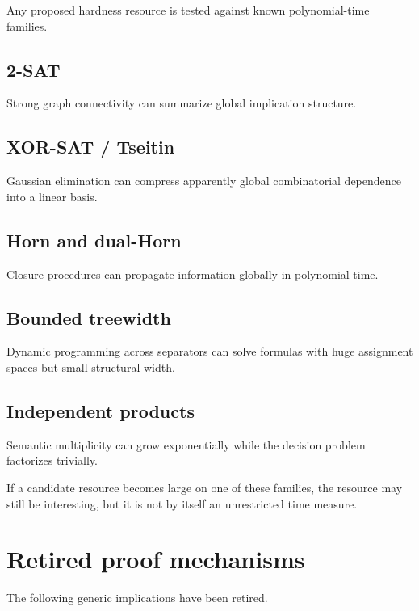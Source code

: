 \documentclass[11pt]{article}
\theoremstyle{plain}
\theoremstyle{definition}
\theoremstyle{remark}
\begin{document}
Any proposed hardness resource is tested against known polynomial-time
families.

\subsection{2-SAT}

Strong graph connectivity can summarize global implication structure.

\subsection{XOR-SAT / Tseitin}

Gaussian elimination can compress apparently global combinatorial dependence
into a linear basis.

\subsection{Horn and dual-Horn}

Closure procedures can propagate information globally in polynomial time.

\subsection{Bounded treewidth}

Dynamic programming across separators can solve formulas with huge assignment
spaces but small structural width.

\subsection{Independent products}

Semantic multiplicity can grow exponentially while the decision problem
factorizes trivially.

If a candidate resource becomes large on one of these families, the resource
may still be interesting, but it is not by itself an unrestricted time measure.

\section{Retired proof mechanisms}

The following generic implications have been retired.
\end{document}
